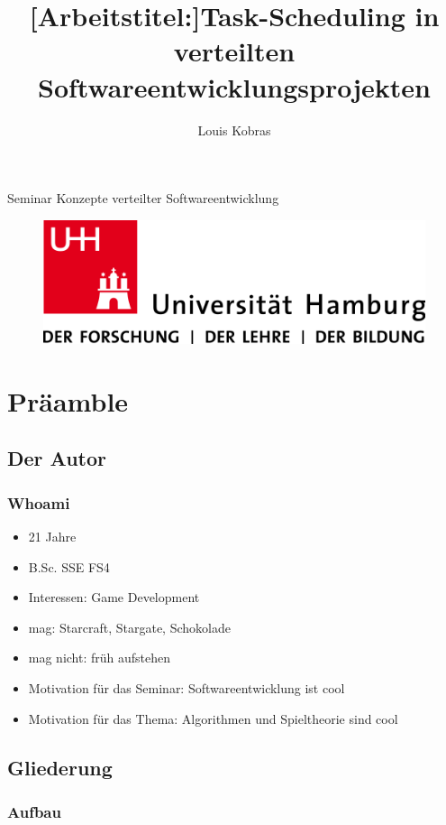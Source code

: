 \documentclass[%
	handout,
	compressed
]{beamer}
\author{Louis Kobras}
\title{[Arbeitstitel:]Task-Scheduling in verteilten Softwareentwicklungsprojekten}
\begin{document}
\begin{frame}
	\maketitle
	\vspace{-0.2cm}
	\begin{center}
		Seminar Konzepte verteilter Softwareentwicklung
		\begin{figure}[h]
			\includegraphics[scale=.2]{img/uhh-logo}
		\end{figure}
	\end{center}
\end{frame}

\section{Präamble}
	\subsection{Der Autor}
		\begin{frame}
			\frametitle{Whoami}
			\begin{itemize}
				\item 21 Jahre
				\item B.Sc. SSE FS4
				\item Interessen: Game Development\pause
				\item mag: Starcraft, Stargate, Schokolade
				\item mag nicht: früh aufstehen\pause
				\item Motivation für das Seminar: Softwareentwicklung ist cool
				\item Motivation für das Thema: Algorithmen und Spieltheorie sind cool
			\end{itemize}
		\end{frame}
	\subsection{Gliederung}
		\begin{frame}
			\frametitle{Aufbau}
			\tableofcontents
		\end{frame}
\end{document}
